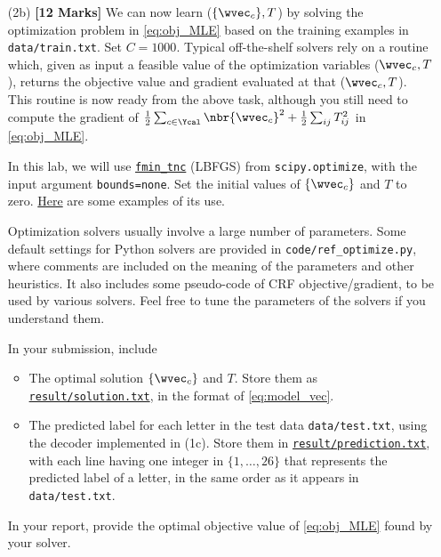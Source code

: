 \documentclass[11pt]{report}
\begin{document}
\begin{itemize}
	{\bf Provide} the value of $\frac{1}{n} \sum_{t=1}^n \log p(\yvec^t | X^t)$ for this case in your report.
	
	For your reference,
	in your instructor's Python implementation,
	it takes 5 seconds to compute the gradient on the whole training set.
	Single core of Intel(R) i7-10510U CPU @ 1.80GHz.
	
	
	\item[(2b)] {\bf [12 Marks]} We can now learn ($\{\wvec_c\}, T$) by solving the optimization problem in \eqref{eq:obj_MLE} based on the training examples in \verb#data/train.txt#.
	Set $C = 1000$.
	Typical off-the-shelf solvers rely on a routine which, given as input a feasible value of the optimization variables ($\wvec_c, T$), returns the objective value and gradient evaluated at that ($\wvec_c, T$). This routine is now ready from the above task,
	although you still need to compute the gradient of $\frac{1}{2} \sum_{c \in \Ycal} \nbr{\wvec_c}^2 + \frac{1}{2} \sum_{ij} T^2_{ij}$ in \eqref{eq:obj_MLE}.
	
	In this lab, we will use \href{https://docs.scipy.org/doc/scipy/reference/generated/scipy.optimize.fmin_tnc.html}{\texttt{fmin\_tnc}} (LBFGS) from \verb#scipy.optimize#, with the input argument \verb#bounds=none#.	
	Set the initial values of $\{\wvec_c\}$ and $T$ to zero.
	\href{https://www.programcreek.com/python/example/114546/scipy.optimize.fmin_tnc}{Here} are some examples of its use.
	
	Optimization solvers usually involve a large number of parameters.
	Some default settings for Python solvers are provided in \verb#code/ref_optimize.py#,
	where comments are included on the meaning of the parameters and other heuristics.
	It also includes some pseudo-code of CRF objective/gradient,
	to be used by various solvers.
	Feel free to tune the parameters of the solvers if you understand them.
	
	In your submission, include
	\begin{itemize}
		\item The optimal solution $\{\wvec_c\}$ and $T$.  Store them as \underline{\tt{result/solution.txt}}, in the format of \eqref{eq:model_vec}.
		\item The predicted label for each letter in the test data \verb#data/test.txt#, using the decoder implemented in (1c).
		Store them in \underline{\tt{result/prediction.txt}},
		with each line having one integer in $\{1,\ldots, 26\}$ that represents the predicted label of a letter, in the same order as it appears in \verb#data/test.txt#.
	\end{itemize}
	In your report, provide the optimal objective value of \eqref{eq:obj_MLE} found by your solver.
\end{itemize}
\end{document}

